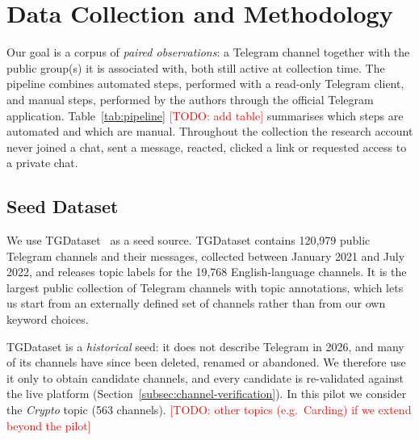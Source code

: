 \providecommand{\TODO}[1]{\textcolor{red}{[TODO: #1]}}

\section{Data Collection and Methodology}
\label{sec:data}

Our goal is a corpus of \emph{paired observations}: a Telegram channel together
with the public group(s) it is associated with, both still active at collection
time. The pipeline combines automated steps, performed with a read-only
Telegram client, and manual steps, performed by the authors through the
official Telegram application. Table~\ref{tab:pipeline} \TODO{add table}
summarises which steps are automated and which are manual. Throughout the
collection the research account never joined a chat, sent a message, reacted,
clicked a link or requested access to a private chat.

\subsection{Seed Dataset}
\label{subsec:seed-dataset}

We use TGDataset~\cite{tgdataset} as a seed source. TGDataset contains
120{,}979 public Telegram channels and their messages, collected between
January 2021 and July 2022, and releases topic labels for the 19{,}768
English-language channels. It is the largest public collection of Telegram
channels with topic annotations, which lets us start from an externally defined
set of channels rather than from our own keyword choices.

TGDataset is a \emph{historical} seed: it does not describe Telegram in 2026,
and many of its channels have since been deleted, renamed or abandoned. We
therefore use it only to obtain candidate channels, and every candidate is
re-validated against the live platform (Section~\ref{subsec:channel-verification}).
In this pilot we consider the \emph{Crypto} topic (563 channels).
\TODO{other topics (e.g.\ Carding) if we extend beyond the pilot}

